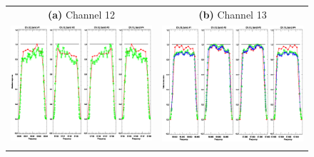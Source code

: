 \begin{figure}[htp]
  \centering
  \begin{tabular}{c c}
    \textsf{\textbf{(a)} Channel 12} &
    \textsf{\textbf{(b)} Channel 13} \\
    \includegraphics[scale=0.5]{graphics/srf/atms_npp.ch12.srf.eps} &
    \includegraphics[scale=0.5]{graphics/srf/atms_npp.ch13.srf.eps} \\\\


\end{tabular}
\end{figure}
